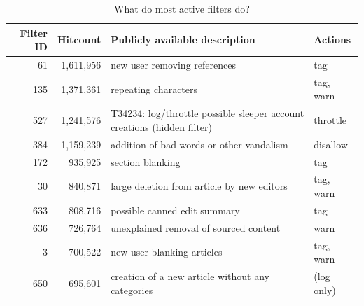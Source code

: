 \begin{table}
  \centering
    \begin{tabular}{r r p{8cm} p{2cm} }
        Filter ID & Hitcount & Publicly available description & Actions \\
    \hline
       61 & 1,611,956 & new user removing references & tag \\
      135 & 1,371,361 & repeating characters & tag, warn \\
      527 & 1,241,576 & T34234: log/throttle possible sleeper account creations (hidden filter) & throttle \\
      384 & 1,159,239 & addition of bad words or other vandalism & disallow \\
      172 & 935,925 & section blanking & tag \\
       30 & 840,871 & large deletion from article by new editors & tag, warn \\
      633 & 808,716 & possible canned edit summary & tag \\
      636 & 726,764 & unexplained removal of sourced content & warn \\
        3 & 700,522 & new user blanking articles & tag, warn \\
      650 & 695,601 & creation of a new article without any categories & (log only) \\
  \end{tabular}
  \caption{What do most active filters do?}~\label{tab:most-active-actions}
\end{table}

